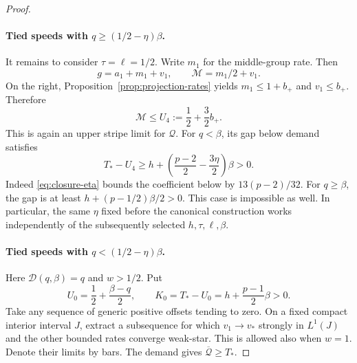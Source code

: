 \begin{proof}
\paragraph{Tied speeds with \(q\ge(1/2-\eta)\beta\).}
It remains to consider \(\tau=\ell=1/2\).  Write \(m_1\) for the
middle-group rate.  Then
\[
  g=a_1+m_1+v_1,\qquad \mathcal M=m_1/2+v_1.
\]
On the right, Proposition~\ref{prop:projection-rates} yields
\(m_1\le1+b_+\) and \(v_1\le b_+\).  Therefore
\[
  \mathcal M\le U_4:=\frac12+\frac32b_+.
\]
This is again an upper stripe limit for \(\mathcal Q\).  For
\(q<\beta\), its gap below demand satisfies
\[
  T_*-U_4
    \ge h+\left(\frac{p-2}{2}-\frac{3\eta}{2}\right)\beta>0.
\]
Indeed \eqref{eq:closure-eta} bounds the coefficient below by
\(13(p-2)/32\).  For \(q\ge\beta\), the gap is at least
\(h+(p-1/2)\beta/2>0\).  This case is impossible as well.  In
particular, the same \(\eta\) fixed before the canonical construction
works independently of the subsequently selected \(h,\tau,\ell,\beta\).

\paragraph{Tied speeds with \(q<(1/2-\eta)\beta\).}
Here \(\mathcal D(q,\beta)=q\) and \(w>1/2\).  Put
\begin{equation}
  U_0=\frac12+\frac{\beta-q}{2},\qquad
  K_0=T_*-U_0=h+\frac{p-1}{2}\beta>0.
  \label{eq:closure-tied-gap}
\end{equation}
Take any sequence of generic positive offsets tending to zero.  On a
fixed compact interior interval \(J\), extract a subsequence for which
\(v_1\to v_*\) strongly in \(L^1(J)\) and the other bounded rates
converge weak-star.  This is allowed also when \(w=1\).  Denote their
limits by bars.  The demand gives \(\overline{\mathcal Q}\ge T_*\).


\end{proof}
